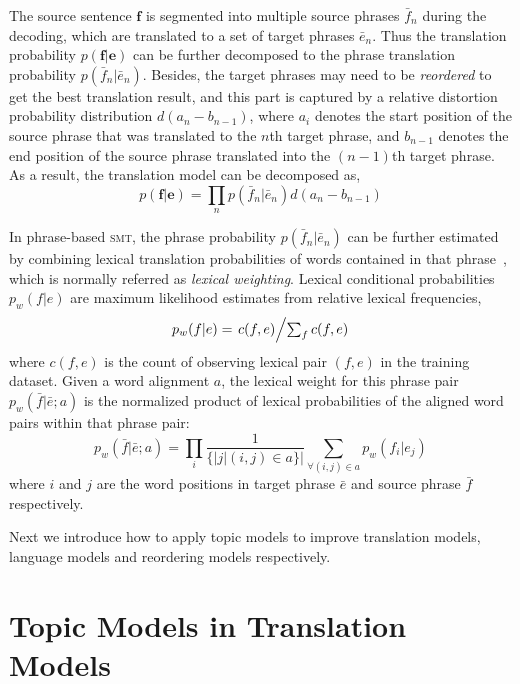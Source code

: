The source sentence $\mathbf{f}$ is segmented into multiple source
phrases $\bar{f}_n$ during the decoding, which are translated to a set
of target phrases $\bar{e}_n$. Thus the translation probability
$p(\mathbf{f}|\mathbf{e})$ can be further decomposed to the phrase
translation probability $p(\bar{f}_n | \bar{e}_n)$. Besides, the
target phrases may need to be \textit{reordered} to get the best
translation result, and this part is captured by a relative distortion
probability distribution $d(a_n - b_{n-1})$, where $a_i$ denotes the
start position of the source phrase that was translated to the $n$th
target phrase, and $b_{n-1}$ denotes the end position of the source
phrase translated into the $(n-1)$th target phrase. As a result, the
translation model can be decomposed as,
\begin{equation}
p(\mathbf{f}|\mathbf{e}) = \prod_{n} p(\bar{f}_n | \bar{e}_n) d(a_n - b_{n-1})
\end{equation}

In phrase-based \textsc{smt}, the phrase probability $p(\bar{f}_n |
\bar{e}_n)$ can be further estimated by combining lexical translation
probabilities of words contained in that phrase~\citep{koehn-03},
which is normally referred as \textit{lexical weighting}. Lexical
conditional probabilities $p_w(f|e)$ are maximum likelihood estimates
from relative lexical frequencies,
\begin{equation}
\label{eq:lexical_prob}
p_w(f|e) = \textstyle \left.c(f, e)\middle/\sum_f{c(f, e)}\right.
\end{equation}
where $c(f, e)$ is the count of observing lexical pair $(f, e)$ in the
training dataset. Given a word alignment $a$, the lexical weight for
this phrase pair $p_w(\bar{f} | \bar{e}; a)$ is the normalized product
of lexical probabilities of the aligned word pairs within that phrase
pair:
\begin{equation}
\label{eq:phrase_prob}
p_w(\bar{f} | \bar{e}; a) = \prod_{i} \frac{1}{\{|j | (i, j) \in a\}|} \sum_{\forall (i,j) \in a} p_w(f_i | e_j)
\end{equation}
where $i$ and $j$ are the word positions in target phrase $\bar{e}$
and source phrase $\bar{f}$ respectively.

Next we introduce how to apply topic models to improve translation
models, language models and reordering models respectively.


\section{Topic Models in Translation Models}

